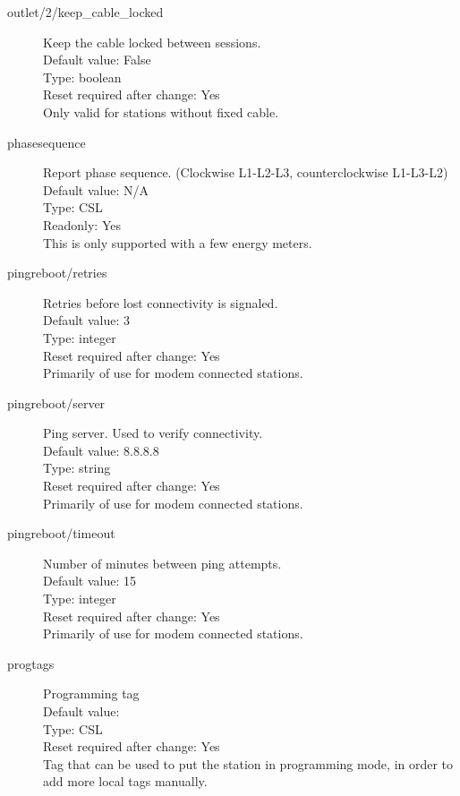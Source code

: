 \begin{description}
\item[outlet/2/keep\_cable\_locked] Keep the cable locked between sessions.\\
  Default value: False\\
  Type: boolean\\
  Reset required after change: Yes\\
  Only valid for stations without fixed cable.\\

\item[phasesequence] Report phase sequence. (Clockwise L1-L2-L3, counterclockwise L1-L3-L2)\\
  Default value: N/A\\
  Type: CSL\\
  Readonly: Yes\\
  This is only supported with a few energy meters.\\

\item[pingreboot/retries] Retries before lost connectivity is signaled.\\
  Default value: 3\\
  Type: integer\\
  Reset required after change: Yes\\
  Primarily of use for modem connected stations.\\

\item[pingreboot/server] Ping server. Used to verify connectivity.\\
  Default value: 8.8.8.8\\
  Type: string\\
  Reset required after change: Yes\\
  Primarily of use for modem connected stations.\\

\item[pingreboot/timeout] Number of minutes between ping attempts.\\
  Default value: 15\\
  Type: integer\\
  Reset required after change: Yes\\
  Primarily of use for modem connected stations.\\

\item[progtags] Programming tag\\
  Default value: \\
  Type: CSL\\
  Reset required after change: Yes\\
  Tag that can be used to put the station in programming mode, in order to add more local tags manually.\\


\end{description}

